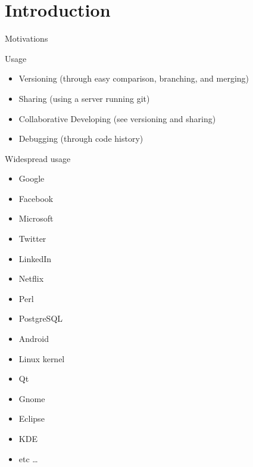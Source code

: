 \documentclass{beamer}
\begin{document}
\section{Introduction}
\begin{frame}{Motivations}
\begin{block}{Usage}
\begin{itemize}
\item Versioning (through easy comparison, branching, and merging)
\item Sharing (using a server running git)
\item Collaborative Developing (see versioning and sharing)
\item Debugging (through code history)
\end{itemize}
\end{block}\pause
\begin{block}{Widespread usage}
\begin{multicols}{4}
\scriptsize
\begin{itemize}
\item Google
\item Facebook
\item Microsoft
\item Twitter
\item LinkedIn
\item Netflix
\item Perl
\item PostgreSQL
\item Android
\item Linux kernel
\item Qt
\item Gnome
\item Eclipse
\item KDE
\item etc \dots
\end{itemize}
\end{multicols}
\center
\end{block}\pause
\begin{center}
\end{center}

\end{frame}
\end{document}
